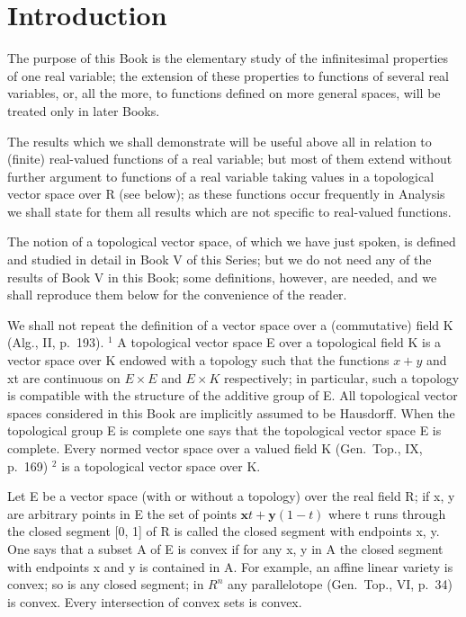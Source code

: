 \chapter*{Introduction}
{}

The purpose of this Book is the elementary study of the infinitesimal properties of one real variable; the extension of these properties to functions of several real variables, or, all the more, to functions defined on more general spaces, will be treated only in later Books.

The results which we shall demonstrate will be useful above all in relation to (finite) real-valued functions of a real variable; but most of them extend without further argument to functions of a real variable taking values in a topological vector space over R (see below); as these functions occur frequently in Analysis we shall state for them all results which are not specific to real-valued functions.

The notion of a topological vector space, of which we have just spoken, is defined and studied in detail in Book V of this Series; but we do not need any of the results of Book V in this Book; some definitions, however, are needed, and we shall reproduce them below for the convenience of the reader.

We shall not repeat the definition of a vector space over a (commutative) field K (Alg., II, p.~193). \(^{1}\) A topological vector space E over a topological field K is a vector space over K endowed with a topology such that the functions \(x + y\) and xt are continuous on \(E \times E\) and \(E \times K\) respectively; in particular, such a topology is compatible with the structure of the additive group of E. All topological vector spaces considered in this Book are implicitly assumed to be Hausdorff. When the topological group E is complete one says that the topological vector space E is complete. Every normed vector space over a valued field K (Gen.~Top., IX, p.~169) \(^{2}\) is a topological vector space over K.

Let E be a vector space (with or without a topology) over the real field R; if x, y are arbitrary points in E the set of points \(\mathbf{x}t + \mathbf{y}(1 - t)\) where t runs through the closed segment {[}0, 1{]} of R is called the closed segment with endpoints x, y. One says that a subset A of E is convex if for any x, y in A the closed segment with endpoints x and y is contained in A. For example, an affine linear variety is convex; so is any closed segment; in \(R^{n}\) any parallelotope (Gen.~Top., VI, p.~34) is convex. Every intersection of convex sets is convex.

